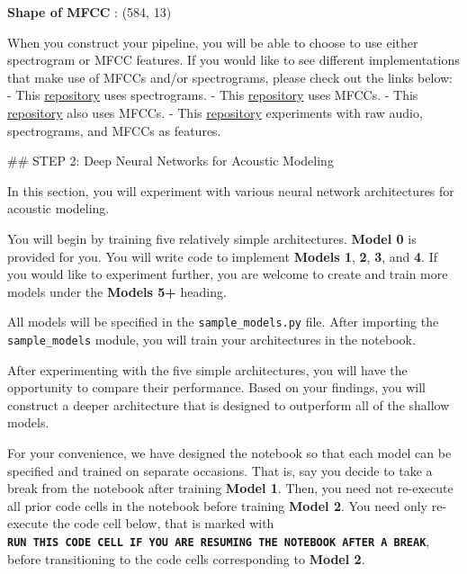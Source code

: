 \documentclass[11pt]{article}
\begin{document}
    \textbf{Shape of MFCC} : (584, 13)

    
    When you construct your pipeline, you will be able to choose to use
either spectrogram or MFCC features. If you would like to see different
implementations that make use of MFCCs and/or spectrograms, please check
out the links below: - This
\href{https://github.com/baidu-research/ba-dls-deepspeech}{repository}
uses spectrograms. - This
\href{https://github.com/mozilla/DeepSpeech}{repository} uses MFCCs. -
This
\href{https://github.com/buriburisuri/speech-to-text-wavenet}{repository}
also uses MFCCs. - This
\href{https://github.com/pannous/tensorflow-speech-recognition/blob/master/speech_data.py}{repository}
experiments with raw audio, spectrograms, and MFCCs as features.

     \#\# STEP 2: Deep Neural Networks for Acoustic Modeling

In this section, you will experiment with various neural network
architectures for acoustic modeling.

You will begin by training five relatively simple architectures.
\textbf{Model 0} is provided for you. You will write code to implement
\textbf{Models 1}, \textbf{2}, \textbf{3}, and \textbf{4}. If you would
like to experiment further, you are welcome to create and train more
models under the \textbf{Models 5+} heading.

All models will be specified in the \texttt{sample\_models.py} file.
After importing the \texttt{sample\_models} module, you will train your
architectures in the notebook.

After experimenting with the five simple architectures, you will have
the opportunity to compare their performance. Based on your findings,
you will construct a deeper architecture that is designed to outperform
all of the shallow models.

For your convenience, we have designed the notebook so that each model
can be specified and trained on separate occasions. That is, say you
decide to take a break from the notebook after training \textbf{Model
1}. Then, you need not re-execute all prior code cells in the notebook
before training \textbf{Model 2}. You need only re-execute the code cell
below, that is marked with
\textbf{\texttt{RUN\ THIS\ CODE\ CELL\ IF\ YOU\ ARE\ RESUMING\ THE\ NOTEBOOK\ AFTER\ A\ BREAK}},
before transitioning to the code cells corresponding to \textbf{Model
2}.
\end{document}
